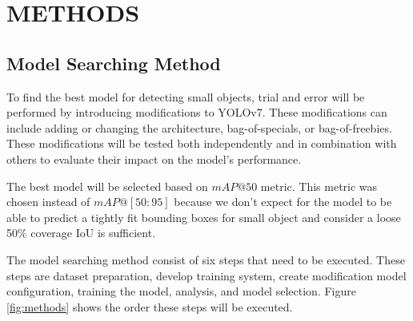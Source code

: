 \chapter{METHODS}
\section{Model Searching Method}


To find the best model for detecting small objects, trial and error will be performed by
introducing modifications to YOLOv7. These modifications can include adding or changing 
the architecture, bag-of-specials, or bag-of-freebies.
These modifications will be tested both independently and in combination with others 
to evaluate their impact on the model's performance.

The best model will be selected based on $mAP@50$ metric.
This metric was chosen instead of $mAP@[50:95]$ because we don't expect for the model to be able to predict a tightly fit
bounding boxes for small object and consider a loose 50\% coverage IoU is sufficient.

The model searching method consist of six steps that need to be executed.
These steps are dataset preparation, develop training system, create modification model configuration,
training the model, analysis, and model selection. 
Figure \ref{fig:methods} shows the order these steps will be executed.

